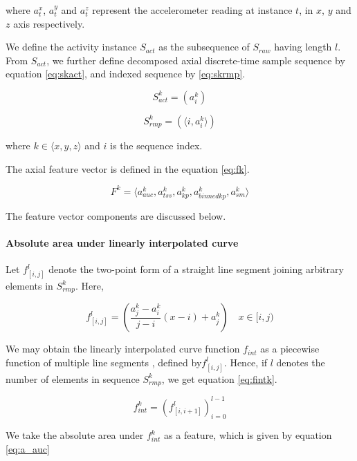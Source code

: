 \documentclass[5p]{elsarticle}
\begin{document}
where $a^x_t$, $a^y_t$ and $a^z_t$ represent the accelerometer reading at instance $t$, in $x$, $y$ and $z$ axis respectively.

We define the activity instance $S_{act}$ as the subsequence of $S_{raw}$ having length $l$. From $S_{act}$, we further define decomposed axial discrete-time sample sequence by equation \ref{eq:skact}, and indexed sequence by \ref{eq:skrmp}.

\begin{equation} \label{eq:skact}
S^k_{act}=(a^k_i)
\end{equation}


\begin{equation} \label{eq:skrmp}
S^k_{rmp}=(\langle i, a^k_i \rangle)
\end{equation}


where $k\in\langle x, y, z \rangle $ and $i$ is the sequence index.

The axial feature vector is defined in the equation \ref{eq:fk}.

\begin{equation} \label{eq:fk}
F^k = \langle a_{auc}^k, a_{tss}^k, a_{kp}^k, a_{binnedkp}^k, a_{sm}^k \rangle
\end{equation}


The feature vector components are discussed below.

\paragraph{Absolute area under linearly interpolated curve}

Let $f^l_{[i,j]}$ denote the two-point form of a straight line segment joining arbitrary elements in $S^k_{rmp}$. Here,

\begin{equation} \label{eq:fl_ij}
f^l_{[i,j]}=(\frac{a^k_j-a^k_i}{j-i}(x-i)+a^k_j) \quad x \in [i, j)
\end{equation}


We may obtain the linearly interpolated curve function $f_{int}$ as a piecewise function of multiple line segments \cite{Bradie} , defined by$f^l_{[i,j]}$. Hence, if $l$ denotes the number of elements in sequence $S^k_{rmp}$, we get equation \ref{eq:fintk}.

\begin{equation} \label{eq:fintk}
f_{int}^k = (f^l_{[i,i+1]})_{i=0}^{l-1}
\end{equation}


We take the absolute area under $f_{int}^k$ as a feature, which is given by equation \ref{eq:a_auc}
\end{document}

